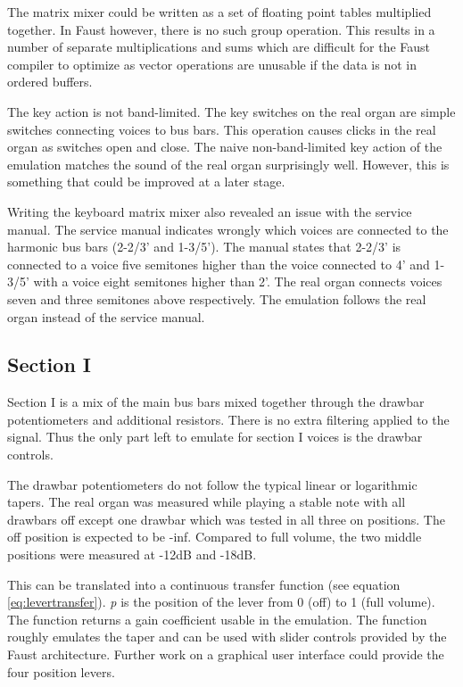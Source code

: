 \documentclass[11pt,a4paper]{article}
\begin{document}
The matrix mixer could be written as a set of floating point tables multiplied together. In Faust however, there is no such group operation. This results in a number of separate multiplications and sums which are difficult for the Faust compiler to optimize as vector operations are unusable if the data is not in ordered buffers.

The key action is not band-limited. The key switches on the real organ are simple switches connecting voices to bus bars. This operation causes clicks in the real organ as switches open and close. The naive non-band-limited key action of the emulation matches the sound of the real organ surprisingly well. However, this is something that could be improved at a later stage.

Writing the keyboard matrix mixer also revealed an issue with the service manual. The service manual indicates wrongly which voices are connected to the harmonic bus bars (2-2/3' and 1-3/5'). The manual states that 2-2/3' is connected to a voice five semitones higher than the voice connected to 4' and 1-3/5' with a voice eight semitones higher than 2'. The real organ connects voices seven and three semitones above respectively. The emulation follows the real organ instead of the service manual.

\subsection{Section I}
\label{section:section-I}

Section I is a mix of the main bus bars mixed together through the drawbar potentiometers and additional resistors. There is no extra filtering applied to the signal. Thus the only part left to emulate for section I voices is the drawbar controls.

The drawbar potentiometers do not follow the typical linear or logarithmic tapers. The real organ was measured while playing a stable note with all drawbars off except one drawbar which was tested in all three on positions. The off position is expected to be -inf. Compared to full volume, the two middle positions were measured at -12dB and -18dB.

This can be translated into a continuous transfer function (see equation \ref{eq:levertransfer}). \emph{p} is the position of the lever from 0 (off) to 1 (full volume). The function returns a gain coefficient usable in the emulation. The function roughly emulates the taper and can be used with slider controls provided by the Faust architecture. Further work on a graphical user interface could provide the four position levers.
\end{document}
